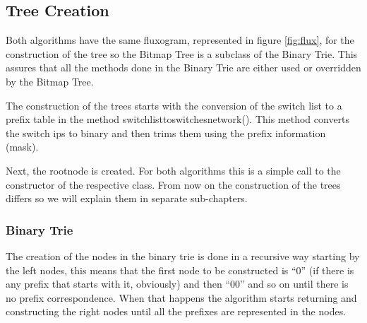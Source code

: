 \documentclass[]{report}
\begin{document}
\subsection{Tree Creation}
Both algorithms have the same fluxogram, represented in figure \ref{fig:flux}, for the construction of the tree so the Bitmap Tree is a subclass of the Binary Trie. This assures that all the methods done in the Binary  Trie are either used or overridden by the Bitmap Tree.

\begin{minipage}{\linewidth}%

\label{fig:flux}
\end{minipage}

The construction of the trees starts with the conversion of the switch list to a prefix table in the method switch\textunderscore list\textunderscore to\textunderscore switches\textunderscore network(). This method converts the switch ips to binary and then trims them using the prefix information (mask).

Next, the root\textunderscore node is created. For both algorithms this is a simple call to the constructor of the respective class.
From now on the construction of the trees differs so we will explain them in separate sub-chapters.

\subsubsection{Binary Trie}
The creation of the nodes in the binary trie is done in a recursive way starting by the left nodes, this means that the first node to be constructed is “0” (if there is any prefix that starts with it, obviously) and then “00” and so on until there is no prefix correspondence. When that happens the algorithm starts returning and constructing the right nodes until all the prefixes are represented in the nodes.
	
\end{document}

